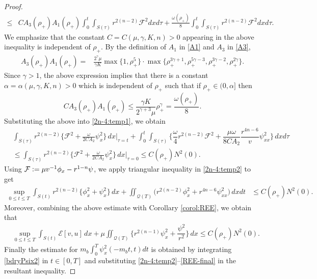 \documentclass[a4paper,12pt,draft]{article}
\theoremstyle{remark}
\def\mE{\mathcal{E}}
\def\mF{\mathcal{F}}
\def\mQ{\mathcal{Q}}
\begin{document}
\begin{proof}
\begin{align}
    \le& C A_3(\rho_{+}) A_1(\rho_{+})\int_{0}^{t}\!\!\int_{S(\tau)} r^{2(n-2)} \mF^2 d x d \tau + \frac{\omega(\rho_+)}{8}\int_{0}^{t}\!\!\int_{S(\tau)} r^{2(n-2)} \mF^2 d x d \tau. \label{2n-4:temp1}
\end{align}
We emphasize that the constant $C=C(\mu,\gamma,K,n)>0$ appearing in the above inequality is independent of $\rho_{+}$. By the definition of $A_1$ in \eqref{A1}  and $A_3$ in \eqref{A3},
\begin{align*}
    A_3(\rho_{+}) A_1(\rho_{+}) %
    =& \frac{2^\gamma \mu}{\gamma K} \max\{1,\rho_{+}^5\} \cdot \max\{ \rho_+^{3\gamma+1}, \rho_{+}^{5\gamma-3}, \rho_{+}^{3\gamma-2}, \rho_{+}^{2\gamma} \}.
\end{align*}
Since $\gamma>1$, the above expression implies that there is a constant $\alpha=\alpha(\mu,\gamma,K,n)>0$ which is independent of $\rho_+$ such that if $\rho_{+}\in (0,\alpha]$ then
\begin{equation*}
    C A_3(\rho_{+}) A_1(\rho_{+}) \le \frac{\gamma K }{2^{\gamma+3}\mu} \rho_+^{\gamma} =\frac{\omega(\rho_{+})}{8}.
\end{equation*}
Substituting the above into \eqref{2n-4:temp1}, we obtain
\begin{align}
   &\int_{S(\tau)}\!\! r^{2(n-2)} \Big\{ \mF^2 + \frac{\omega}{2C A_2} \psi_x^2 \Big\}\, d x \bigg\vert_{\tau=t} + \int_{0}^{t}\!\!\int_{S(\tau)}\!\! \Big\{ \dfrac{\omega}{4}r^{2(n-2)}\mF^2 + \dfrac{\mu \omega}{8C A_2} \dfrac{r^{4n-6}}{v} \psi_{xx}^2 \Big\} \, d x d\tau \nonumber\\
    &\le  \int_{S(\tau)}\!\! r^{2(n-2)} \Big\{ \mF^2 + \frac{\omega}{2C A_2} \psi_x^2 \Big\}\, d x \bigg\vert_{\tau=0} \le C(\rho_+) N^2(0). \label{2n-4:temp2}
\end{align}
Using $\mF\vcentcolon= \mu v^{-1} \phi_x - r^{1-n} \psi$, we apply triangular inequality in \eqref{2n-4:temp2} to get
\begin{align*}
      \sup\limits_{0\le t\le T}\int_{S(t)}\!\! r^{2(n-2)} \big\{ \phi_x^2 + \psi_x^2 \big\}\, d x +\iint_{\mQ(T)}\!\! \Big( r^{2(n-2)}\phi_x^2 +  r^{4n-6} \psi_{xx}^2 \Big) \, d x d t & \le C(\rho_{+}) N^2(0).
\end{align*}
Moreover, combining the above estimate with Corollary \ref{corol:REE}, we obtain that
\begin{align}
    &\sup\limits_{0\le t\le T} \int_{S(t)}\!\! \mE[v,u]\, d x + \mu\!\!\iint_{\mQ(T)}\!\! \Big\{ r^{2(n-1)}\psi_x^2 + \dfrac{\psi^2}{ r^2}   \Big\}\, d x \le C(\rho_{+}) N^2(0). \label{REE-final}
\end{align}
Finally the estimate for $m_b\int_{0}^T \psi_x^2 (-m_bt,t)dt$ is obtained by integrating \eqref{bdryPsix2} in $t\in[0,T]$ and substituting \eqref{2n-4:temp2}--\eqref{REE-final} in the resultant inequality.
\end{proof}
\end{document}
